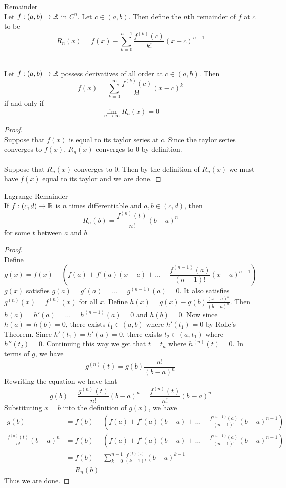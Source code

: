 \documentclass[a4paper]{article}
\begin{document}
\begin{defn}{Remainder}{}\\ Let $f:(a,b)\to\mathbb{R}$ in $C^n$. Let $c\in(a,b)$. Then define the $n$th remainder of $f$ at $c$ to be $$R_n(x)=f(x)-\sum_{k=0}^{n-1}\frac{f^{(k)}(c)}{k!}(x-c)^{n-1}$$
\end{defn}

\begin{thm}{}{}\\ Let $f:(a,b)\to\mathbb{R}$ possess derivatives of all order at $c\in(a,b)$. Then $$f(x)=\sum_{k=0}^{\infty}\frac{f^{(k)}(c)}{k!}(x-c)^k$$ if and only if $$\lim_{n\to\infty}R_n(x)=0$$ 
\begin{proof}\\
Suppose that $f(x)$ is equal to its taylor series at $c$. Since the taylor series converges to $f(x)$, $R_n(x)$ converges to $0$ by definition. \\~\\
Suppose that $R_n(x)$ converges to $0$. Then by the definition of $R_n(x)$ we must have $f(x)$ equal to its taylor and we are done. 
\end{proof}
\end{thm}

\begin{thm}{Lagrange Remainder}{}\\ If $f:(c,d)\to\mathbb{R}$ is $n$ times differentiable and $a,b\in(c,d)$, then $$R_n(b)=\frac{f^{(n)}(t)}{n!}(b-a)^n$$ for some $t$ between $a$ and $b$. 
\begin{proof}\\ Define $$g(x)=f(x)-\left(f(a)+f'(a)(x-a)+\dots+\frac{f^{(n-1)}(a)}{(n-1)!}(x-a)^{n-1}\right)$$ $g(x)$ satisfies $g(a)=g'(a)=\dots=g^{(n-1)}(a)=0$. It also satisfies $g^{(n)}(x)=f^{(n)}(x)$ for all $x$. Define $h(x)=g(x)-g(b)\frac{(x-a)^n}{(b-a)^n}$. Then $h(a)=h'(a)=\dots=h^{(n-1)}(a)=0$ and $h(b)=0$. Now since $h(a)=h(b)=0$, there exists $t_1\in(a,b)$ where $h'(t_1)=0$ by Rolle's Theorem. Since $h'(t_1)=h'(a)=0$, there exists $t_2\in(a,t_1)$ where $h''(t_2)=0$. Continuing this way we get that $t=t_n$ where $h^{(n)}(t)=0$. In terms of $g$, we have $$g^{(n)}(t)=g(b)\frac{n!}{(b-a)^n}$$ Rewriting the equation we have that $$g(b)=\frac{g^{(n)}(t)}{n!}(b-a)^n=\frac{f^{(n)}(t)}{n!}(b-a)^n$$ Substituting $x=b$ into the definition of $g(x)$, we have 
\begin{align*}
g(b)&=f(b)-\left(f(a)+f'(a)(b-a)+\dots+\frac{f^{(n-1)}(a)}{(n-1)!}(b-a)^{n-1}\right)\\
\frac{f^{(n)}(t)}{n!}(b-a)^n&=f(b)-\left(f(a)+f'(a)(b-a)+\dots+\frac{f^{(n-1)}(a)}{(n-1)!}(b-a)^{n-1}\right)\\
&=f(b)-\sum_{k=0}^{n-1}\frac{f^{(k)(a)}}{(k-1)!}(b-a)^{k-1}\\
&=R_n(b)
\end{align*}
Thus we are done. 
\end{proof}
\end{thm}
\end{document}

